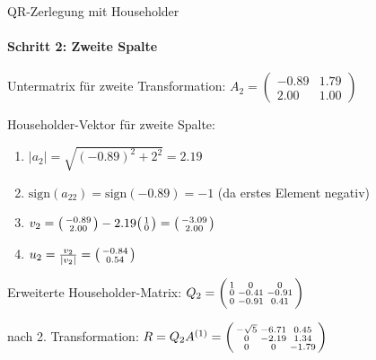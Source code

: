 \begin{example2}[breakable]{QR-Zerlegung mit Householder}
\paragraph{Schritt 2: Zweite Spalte}
Untermatrix für zweite Transformation:
$A_2 = \begin{pmatrix} -0.89 & 1.79\\ 2.00 & 1.00 \end{pmatrix}$

Householder-Vektor für zweite Spalte:
\vspace{1mm}
\begin{enumerate}
    \item $|a_2| = \sqrt{(-0.89)^2 + 2^2} = 2.19$
    \vspace{1mm}
    \item $\text{sign}(a_{22}) = \text{sign}(-0.89) = -1$ (da erstes Element negativ)
    \vspace{1mm}
    \item $v_2 = \begin{psmallmatrix} -0.89\\ 2.00 \end{psmallmatrix} - 2.19\begin{psmallmatrix} 1\\ 0 \end{psmallmatrix} = \begin{psmallmatrix} -3.09\\ 2.00 \end{psmallmatrix}$
    \vspace{1mm}
    \item $u_2 = \frac{v_2}{|v_2|} = \begin{psmallmatrix} -0.84\\ 0.54 \end{psmallmatrix}$
\end{enumerate}
\vspace{1mm}
Erweiterte Householder-Matrix:
$Q_2 = \begin{psmallmatrix}
1 & 0 & 0\\
0 & -0.41 & -0.91\\
0 & -0.91 & 0.41
\end{psmallmatrix}$

nach 2. Transformation:
$R = Q_2A^{(1)} = \begin{psmallmatrix}
-\sqrt{5} & -6.71 & 0.45\\
0 & -2.19 & 1.34\\
0 & 0 & -1.79
\end{psmallmatrix}$


\end{example2}
